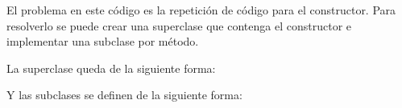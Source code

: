 \begin{code}
\begin{Shaded}
\begin{Highlighting}[]
     \NormalTok{(}
\OperatorTok{=} 
         \OperatorTok{/}\OperatorTok{*}\OperatorTok{+}\OperatorTok{{-}}\OperatorTok{{-}}\OperatorTok{/}\NormalTok{(}\OperatorTok{*}\OperatorTok{{-}} \OperatorTok{/} \OperatorTok{*}\OperatorTok{+}\OperatorTok{*}\OperatorTok{{-}}\OperatorTok{{-}}\OperatorTok{*}\OperatorTok{*}\NormalTok{(}\OperatorTok{*}
\end{Highlighting}
\end{Shaded}

El problema en este código es la repetición de código para el
constructor. Para resolverlo se puede crear una superclase que contenga
el constructor e implementar una subclase por método.

La superclase queda de la siguiente forma:

\begin{Shaded}
\begin{Highlighting}[]
     \NormalTok{(}\OperatorTok{=}\NormalTok{):}
        \OperatorTok{=}
\end{Highlighting}
\end{Shaded}

Y las subclases se definen de la siguiente forma:

\begin{Shaded}
\begin{Highlighting}[]
     \NormalTok{(}
\OperatorTok{=} 
        \OperatorTok{+}\OperatorTok{{-}}\OperatorTok{/}

     \NormalTok{(}
\OperatorTok{=} 
        \OperatorTok{+}\OperatorTok{{-}}\OperatorTok{{-}}\OperatorTok{/}\OperatorTok{/}


\end{Highlighting}
\end{Shaded}
\end{code}
